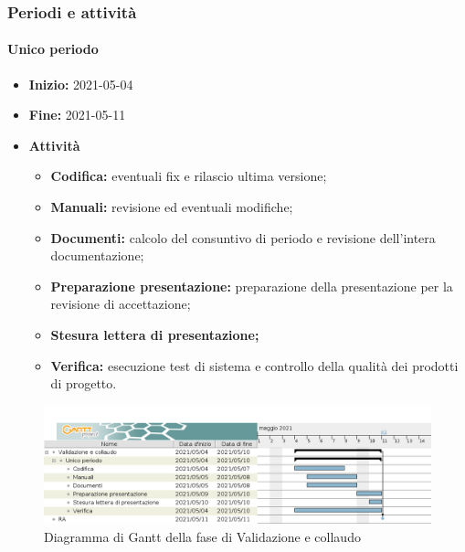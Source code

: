 \subsubsection{Periodi e attività}

\paragraph[Unico periodo]{Unico periodo}
\begin{itemize}
    \item [] \textbf{Inizio:} 2021-05-04
    \item [] \textbf{Fine:} 2021-05-11
    \item [] \textbf{Attività}
          \begin{itemize}
              \item \textbf{Codifica:} eventuali fix e rilascio ultima versione;
              \item \textbf{Manuali:} revisione ed eventuali modifiche;
              \item \textbf{Documenti:} calcolo del consuntivo di periodo e revisione dell'intera documentazione;
              \item \textbf{Preparazione presentazione:} preparazione della presentazione per la revisione di accettazione;
              \item \textbf{Stesura lettera di presentazione;}
              \item \textbf{Verifica:} esecuzione test di sistema e controllo della qualità dei prodotti di progetto.
          \end{itemize}
\end{itemize}

\begin{figure}[H]
    \centering
    \includegraphics[width=1\linewidth]{res/images/pianificazione/validazione_e_collaudo.png}
    \caption{Diagramma di Gantt della fase di Validazione e collaudo}
    \label{fig:_Gantt Validazione e collaudo}
\end{figure}

